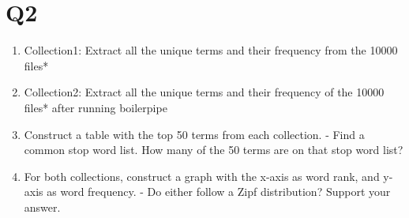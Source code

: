 


\section{Q2}
\label{part2}
\begin{enumerate}

\item Collection1: Extract all the unique terms and their frequency from the 10000 files*

\item Collection2: Extract all the unique terms and their frequency of the 10000 files* after running boilerpipe

\item Construct a table with the top 50 terms from each collection. 
	- Find a common stop word list.  How many of the 50 terms are on that stop word list?

\item For both collections, construct a graph with the x-axis as word rank, and y-axis as word frequency.  
	- Do either follow a Zipf distribution? Support your answer.

\end{enumerate}

